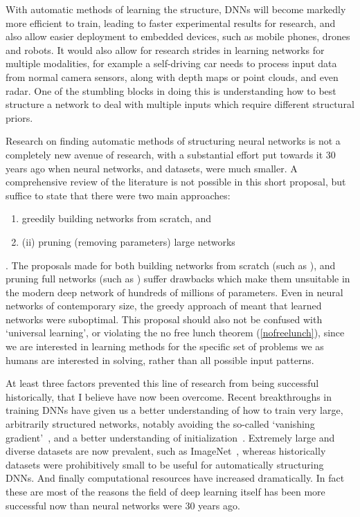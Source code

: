 \documentclass[thesis]{subfiles}
\begin{document}
With automatic methods of learning the structure, DNNs will become markedly more efficient to train, leading to faster experimental results for research, and also allow easier deployment to embedded devices, such as mobile phones, drones and robots. It would also allow for research strides in learning networks for multiple modalities, for example a self-driving car needs to process input data from normal camera sensors, along with depth maps or point clouds, and even radar. One of the stumbling blocks in doing this is understanding how to best structure a network to deal with multiple inputs which require different structural priors.

Research on finding automatic methods of structuring neural networks is not a completely new avenue of research, with a substantial effort put towards it 30 years ago when neural networks, and datasets, were much smaller. A comprehensive review of the literature is not possible in this short proposal, but suffice to state that there were two main approaches:
\begin{enumerate}[label= (\textbf{\roman*})]
	\item greedily building networks from scratch, and 
	\item(ii) pruning (removing parameters) large networks
\end{enumerate}. The proposals made for both building networks from scratch (such as \citep{Fahlman1989}), and pruning full networks (such as \citep{lecun1989optimal}) suffer drawbacks which make them unsuitable in the modern deep network of hundreds of millions of parameters. Even in neural networks of contemporary size, the greedy approach of \citet{Fahlman1989} meant that learned networks were suboptimal. This proposal should also not be confused with `universal learning', or violating the no free lunch theorem (\cref{nofreelunch}), since we are interested in learning methods for the specific set of problems we as humans are interested in solving, rather than all possible input patterns.

At least three factors prevented this line of research from being successful historically, that I believe have now been overcome. Recent breakthroughs in training DNNs have given us a better understanding of how to train very large, arbitrarily structured networks, notably avoiding the so-called `vanishing gradient'~\citep{Ioffe2015,He2016}, and a better understanding of initialization~\citep{He2015b}. Extremely large and diverse datasets are now prevalent, such as ImageNet~\citep{ILSVRC2015}, whereas historically datasets were prohibitively small to be useful for automatically structuring DNNs. And finally computational resources have increased dramatically. In fact these are most of the reasons the field of deep learning itself has been more successful now than neural networks were 30 years ago.
\end{document}
